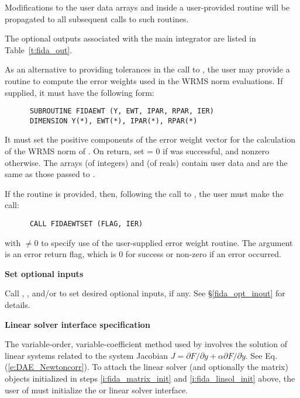 \begin{Steps}
{    Modifications to the user data arrays  and  inside a
    user-provided routine will be propagated to all subsequent calls to
    such routines.

    The optional outputs associated with the main {\ida} integrator
    are listed in Table~\ref{t:fida_out}.
  }

  As an alternative to providing tolerances in the call to , the
  user may provide a routine to compute the error weights used in the WRMS norm
  evaluations. If supplied, it must have the following form:
\begin{verbatim}
      SUBROUTINE FIDAEWT (Y, EWT, IPAR, RPAR, IER)
      DIMENSION Y(*), EWT(*), IPAR(*), RPAR(*)
\end{verbatim}
  It must set the positive components of the error weight vector  for
  the calculation of the WRMS norm of . On return, set
   = 0 if  was successful, and nonzero otherwise.
  The arrays  (of integers) and  (of reals) contain user data
  and are the same as those passed to .

  If the  routine is provided, then,
  following the call to , the user must make the call:
\begin{verbatim}
      CALL FIDAEWTSET (FLAG, IER)
\end{verbatim}
  with  $\neq 0$ to specify use of the user-supplied error weight routine.
  The argument  is an error return flag, which is $0$
  for success or non-zero if an error occurred.

\item\label{i:fida_opt_input}{\bf Set optional inputs}

  Call , , and/or  to set desired
  optional inputs, if any.  See \S\ref{fida_opt_inout} for details.

\item\label{i:fida_lin_solv_spec} {\bf Linear solver interface specification}

  The variable-order, variable-coefficient  method used by {\ida} involves
  the solution of linear systems related to the system Jacobian
  $J = \partial F / \partial y + \alpha \partial F / \partial \dot{y}$.
  See Eq. (\ref{e:DAE_Newtoncorr}).
  To attach the linear solver (and optionally the matrix) objects
  initialized in steps \ref{i:fida_matrix_init} and
  \ref{i:fida_linsol_init} above, the user of {\fida} must initialize
  the {\idadls} or {\idaspils} linear solver interface.


\end{Steps}
